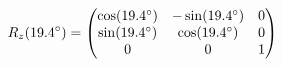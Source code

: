 \documentclass[preview]{standalone}
\begin{document}
\begin{align*}
\special{dvisvgm:raw <g id='unique000'>}R_z(19.4^\circ) = \begin{pmatrix} \cos(19.4^\circ) & -\sin(19.4^\circ) & 0 \\ \sin(19.4^\circ) & \cos(19.4^\circ) & 0 \\ 0 & 0 & 1 \end{pmatrix}\special{dvisvgm:raw </g>}
\end{align*}
\end{document}
